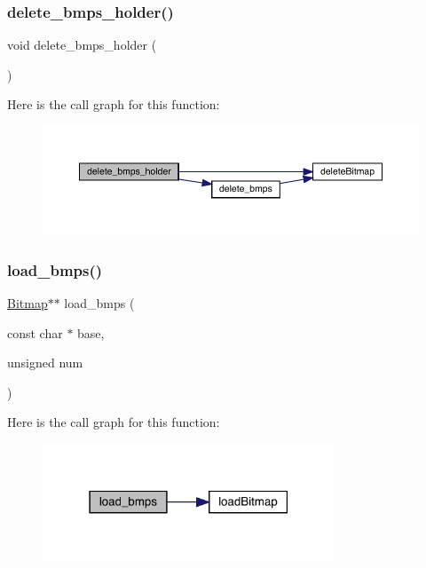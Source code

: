 \subsubsection{\texorpdfstring{delete\+\_\+bmps\+\_\+holder()}{delete\_bmps\_holder()}}
{\footnotesize\ttfamily void delete\+\_\+bmps\+\_\+holder (\begin{DoxyParamCaption}{ }\end{DoxyParamCaption})}

Here is the call graph for this function\+:\nopagebreak
\begin{figure}[H]
\begin{center}
\leavevmode
\includegraphics[width=350pt]{group___b_m_ps_holder_gaa0a362e75eb034aa78e675ecb1b9c6da_cgraph}
\end{center}
\end{figure}
\hypertarget{group___b_m_ps_holder_gab74a07b3201edddc82762946608675a5}{}\label{group___b_m_ps_holder_gab74a07b3201edddc82762946608675a5} 
\subsubsection{\texorpdfstring{load\+\_\+bmps()}{load\_bmps()}}
{\footnotesize\ttfamily \hyperlink{struct_bitmap}{Bitmap}$\ast$$\ast$ load\+\_\+bmps (\begin{DoxyParamCaption}\item[{const char $\ast$}]{base,  }\item[{unsigned}]{num }\end{DoxyParamCaption})}

Here is the call graph for this function\+:\nopagebreak
\begin{figure}[H]
\begin{center}
\leavevmode
\includegraphics[width=247pt]{group___b_m_ps_holder_gab74a07b3201edddc82762946608675a5_cgraph}
\end{center}
\end{figure}
